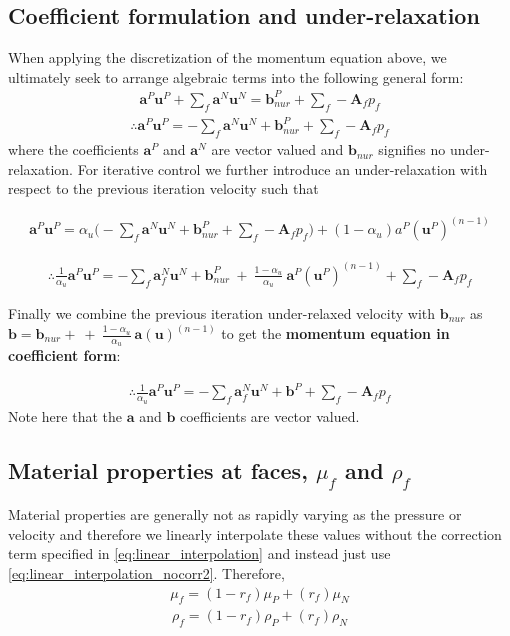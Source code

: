 \documentclass[11pt,letterpaper,titlepage]{article}
\newcommand{\beq}{\begin{equation*}
\begin{aligned}}
\newcommand{\eeq}{\end{aligned}
\end{equation*}}
\newcommand{\beqn}{\begin{equation}
	\begin{aligned}}
\newcommand{\eeqn}{\end{aligned}
	\end{equation}}
\newcommand{\bvel}{\mathbf{u}}
\numberwithin{equation}{section}
\begin{document}
\subsection{Coefficient formulation and under-relaxation}

When applying the discretization of the momentum equation above, we ultimately seek to arrange algebraic terms into the following general form:
\beq 
\mathbf{a}^P \bvel^P + \sum_f \mathbf{a}^N \bvel^N = \mathbf{b}_{nur}^P + \sum_f -\mathbf{A}_f p_f
\eeq 
\beq
\therefore
\mathbf{a}^P \bvel^P  = - \sum_f \mathbf{a}^N \bvel^N + \mathbf{b}_{nur}^P + \sum_f -\mathbf{A}_f p_f
\eeq
where the coefficients $\mathbf{a}^P$ and $\mathbf{a}^N$ are vector valued and $\mathbf{b}_{nur}$ signifies no under-relaxation. 
For iterative control we further introduce an under-relaxation with respect to the previous iteration velocity such that 

\beq 
\mathbf{a}^P \bvel^P  = 
\alpha_u \biggr (
- \sum_f \mathbf{a}^N \bvel^N + \mathbf{b}_{nur}^P + \sum_f -\mathbf{A}_f p_f
\biggr) 
+
(1-\alpha_u) a^P (\bvel^P)^{(n-1)}
\eeq 

\beq
\therefore
\frac{1}{\alpha_u} \mathbf{a}^P \bvel^P  = 
- \sum_f \mathbf{a}_f^N \bvel^N +
\mathbf{b}_{nur}^P \ + \ \frac{1-\alpha_u}{\alpha_u} \ \mathbf{a}^P (\bvel^P)^{(n-1)}
+ \sum_f -\mathbf{A}_f p_f
\eeq

Finally we combine the previous iteration under-relaxed velocity with $\mathbf{b}_{nur}$ as $\mathbf{b} = \mathbf{b}_{nur} + \ + \ \frac{1-\alpha_u}{\alpha_u} \ \mathbf{a} (\bvel)^{(n-1)}$
to get the \textbf{momentum equation in coefficient form}:

\beqn \label{eq:momentum_coefficient_form}
\therefore
\frac{1}{\alpha_u} \mathbf{a}^P \bvel^P  = 
- \sum_f \mathbf{a}_f^N \bvel^N +
\mathbf{b}^P 
+ \sum_f -\mathbf{A}_f p_f
\eeqn
Note here that the $\mathbf{a}$ and $\mathbf{b}$ coefficients are vector valued.


\subsection{Material properties at faces, $\mu_f$ and $\rho_f$}
Material properties are generally not as rapidly varying as the pressure or velocity and therefore we linearly interpolate these values without the correction term specified in \eqref{eq:linear_interpolation} and instead just use \eqref{eq:linear_interpolation_nocorr2}. Therefore,
\beqn
\mu_f = (1-r_f)\mu_P + (r_f)\mu_N 
\eeqn
\beqn
\rho_f = (1-r_f)\rho_P + (r_f)\rho_N 
\eeqn
\end{document}
